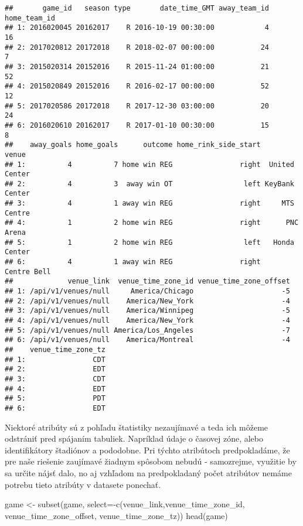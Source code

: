 \documentclass[
]{article}
\newenvironment{Shaded}{\begin{snugshade}}{\end{snugshade}}
\newcommand{\AttributeTok}[1]{\textcolor[rgb]{0.77,0.63,0.00}{#1}}
\newcommand{\FunctionTok}[1]{\textcolor[rgb]{0.00,0.00,0.00}{#1}}
\newcommand{\NormalTok}[1]{#1}
\newcommand{\OtherTok}[1]{\textcolor[rgb]{0.56,0.35,0.01}{#1}}
\newcommand{\SpecialCharTok}[1]{\textcolor[rgb]{0.00,0.00,0.00}{#1}}
\begin{document}
\begin{verbatim}
##       game_id   season type       date_time_GMT away_team_id home_team_id
## 1: 2016020045 20162017    R 2016-10-19 00:30:00            4           16
## 2: 2017020812 20172018    R 2018-02-07 00:00:00           24            7
## 3: 2015020314 20152016    R 2015-11-24 01:00:00           21           52
## 4: 2015020849 20152016    R 2016-02-17 00:00:00           52           12
## 5: 2017020586 20172018    R 2017-12-30 03:00:00           20           24
## 6: 2016020610 20162017    R 2017-01-10 00:30:00           15            8
##    away_goals home_goals      outcome home_rink_side_start          venue
## 1:          4          7 home win REG                right  United Center
## 2:          4          3  away win OT                 left KeyBank Center
## 3:          4          1 away win REG                right     MTS Centre
## 4:          1          2 home win REG                right      PNC Arena
## 5:          1          2 home win REG                 left   Honda Center
## 6:          4          1 away win REG                right    Centre Bell
##             venue_link  venue_time_zone_id venue_time_zone_offset
## 1: /api/v1/venues/null     America/Chicago                     -5
## 2: /api/v1/venues/null    America/New_York                     -4
## 3: /api/v1/venues/null    America/Winnipeg                     -5
## 4: /api/v1/venues/null    America/New_York                     -4
## 5: /api/v1/venues/null America/Los_Angeles                     -7
## 6: /api/v1/venues/null    America/Montreal                     -4
##    venue_time_zone_tz
## 1:                CDT
## 2:                EDT
## 3:                CDT
## 4:                EDT
## 5:                PDT
## 6:                EDT
\end{verbatim}

Niektoré atribúty sú z pohľadu štatistiky nezaujímavé a teda ich môžeme
odstrániť pred spájaním tabuliek. Napríklad údaje o časovej zóne, alebo
identifikátory štadiónov a pododobne. Pri týchto atribútoch
predpokladáme, že pre naše riešenie zaujímavé žiadnym spôsobom nebudú -
samozrejme, využitie by sa určite nájsť dalo, no aj vzhľadom na
predpokladaný počet atribútov nemáme potrebu tieto atribúty v datasete
ponechať.

\begin{Shaded}
\begin{Highlighting}[]
\NormalTok{game }\OtherTok{\textless{}{-}} \FunctionTok{subset}\NormalTok{(game, }\AttributeTok{select=}\SpecialCharTok{{-}}\FunctionTok{c}\NormalTok{(venue\_link,venue\_time\_zone\_id, venue\_time\_zone\_offset, venue\_time\_zone\_tz))}
\FunctionTok{head}\NormalTok{(game)}
\end{Highlighting}
\end{Shaded}
\end{document}
